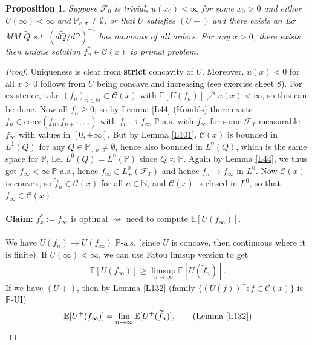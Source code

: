 \documentclass[12pt,a4paper, twoside]{article}
\newtheorem{prop}{Proposition}[section]
\theoremstyle{definition}
\newcommand{\EE}{\mathbb{E}} %
\newcommand{\PP}{\mathbb{P}} %
\begin{document}
\begin{prop} \label{P133} Suppose $\mathcal{F}_0$ is trivial,  $u(x_0) < \infty$ for some $x_0 >0$ and either $U( \infty) < \infty$ and $\PP_{e, \sigma} \neq \emptyset$, or that $U$ satisfies $(U+)$ and there exists an E$\sigma$MM $\widetilde{Q}$ s.t. $(d \widetilde{Q} / d \PP)^{-1}$ has moments of all orders. For any $x>0$, there exists then unique solution $f_x^* \in \mathcal{C}(x)$ to primal problem. 
\end{prop}
\begin{proof}
Uniqueness is clear from \textbf{strict} concavity of $U$. Moreover, $u(x) <0$ for all $x>0$ follows from $U$ being concave and increasing (see exercise sheet $8$). For existence,  take $(f_n)_{n \in \mathbb{N}} \subset \mathcal{C}(x)$ with $\EE[U(f_n)] \nearrow u(x) < \infty$, so this can be done. Now all $f_n \geq 0$; so by Lemma \ref{L44} (Komlós) there exists $\widetilde{f}_n \in \text{conv}(f_n, f_{n+1}, \dots )$ with $\widetilde{f}_n \to f_\infty$ $\PP$-a.s. with $f_\infty$ for some $\mathcal{F}_T$-measurable $f_\infty$ with values in $[0, + \infty]$. But by Lemma \ref{L101}, $\mathcal{C}(x)$ is bounded in $L^1(Q)$ for any $Q \in \PP_{e, \sigma} \neq \emptyset$, hence also bounded in $L^0(Q)$, which is the same space for $\PP$,  i.e. $L^0(Q)= L^0(\PP)$ since $Q \approx \PP$. Again by Lemma \ref{L44}, we thus get $f_\infty < \infty \ \PP$-a.s., hence $f_\infty \in L_+^0( \mathcal{F}_T)$ and hence $\widetilde{f}_n \to f_\infty$ in $L^0$. 
\newpage
Now $\mathcal{C}(x)$ is convex, so $\widetilde{f}_n \in \mathcal{C}(x)$ for all $n \in \mathbb{N}$, and $\mathcal{C}(x)$ is closed in $L^0$, so that $f_\infty \in \mathcal{C}(x)$. 
\\\\
\textbf{Claim}: $f_x^*:= f_\infty$ is optimal $\rightsquigarrow$ need to compute $\EE[U(f_\infty)]$. \\
\\
We have $U(f_n) \to U(f_\infty)$ $\PP$-a.s. (since $U$ is concave, then continuous where it is finite). If $U( \infty)< \infty$, we can use Fatou limsup version to get 
\begin{align*}
\EE[U(f_\infty)] \geq \limsup_{n \to \infty} \EE[U( \widetilde{f}_n)].
\end{align*}
If we have $(U+)$, then by Lemma \ref{L132} (family $\{(U(f))^+: f \in \mathcal{C}(x)\}$ is $\PP$-UI)
\begin{align*}
& \EE[U^+(f_\infty)] = \lim_{n \to \infty} \EE[U^+( \widetilde{f}_n)], \tag{Lemma \ref{L132}} \\

\end{align*}
\end{proof}
\end{document}

